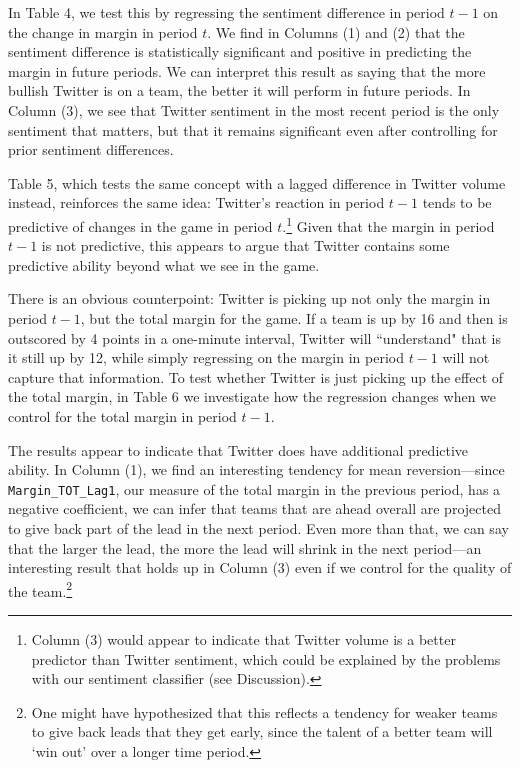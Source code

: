 \documentclass[12pt]{article}
\begin{document}
\begin{doublespacing}
In Table 4, we test this by regressing the sentiment difference in period $t-1$ on the change in margin in period $t$. We find in Columns (1) and (2) that the sentiment difference is statistically significant and positive in predicting the margin in future periods. We can interpret this result as saying that the more bullish Twitter is on a team, the better it will perform in future periods. In Column (3), we see that Twitter sentiment in the most recent period is the only sentiment that matters, but that it remains significant even after controlling for prior sentiment differences. 

Table 5, which tests the same concept with a lagged difference in Twitter volume instead, reinforces the same idea: Twitter's reaction in period $t-1$ tends to be predictive of changes in the game in period $t$.\footnote{Column (3) would appear to indicate that Twitter volume is a better predictor than Twitter sentiment, which could be explained by the problems with our sentiment classifier (see Discussion).} Given that the margin in period $t-1$ is not predictive, this appears to argue that Twitter contains some predictive ability beyond what we see in the game. 

There is an obvious counterpoint: Twitter is picking up not only the margin in period $t-1$, but the total margin for the game. If a team is up by 16 and then is outscored by 4 points in a one-minute interval, Twitter will ``understand" that is it still up by 12, while simply regressing on the margin in period $t-1$ will not capture that information. To test whether Twitter is just picking up the effect of the total margin, in Table 6 we investigate how the regression changes when we control for the total margin in period $t-1$.

The results appear to indicate that Twitter does have additional predictive ability. In Column (1), we find an interesting tendency for mean reversion---since \texttt{Margin\_TOT\_Lag1}, our measure of the total margin in the previous period, has a negative coefficient, we can infer that teams that are ahead overall are projected to give back part of the lead in the next period. Even more than that, we can say that the larger the lead, the more the lead will shrink in the next period---an interesting result that holds up in Column (3) even if we control for the quality of the team.\footnote{One might have hypothesized that this reflects a tendency for weaker teams to give back leads that they get early, since the talent of a better team will `win out' over a longer time period.}


\end{doublespacing}
\end{document}
